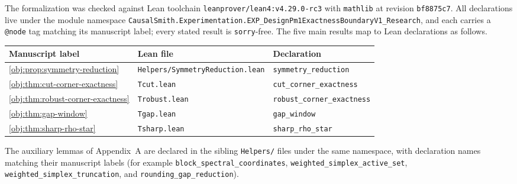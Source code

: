 The formalization was checked against Lean toolchain \texttt{leanprover/lean4:v4.29.0-rc3} with \texttt{mathlib} at revision \texttt{bf8875c7}. All declarations live under the module namespace \texttt{CausalSmith.Experimentation.EXP\_DesignPm1ExactnessBoundaryV1\_Research}, and each carries a \texttt{@node} tag matching its manuscript label; every stated result is \texttt{sorry}-free. The five main results map to Lean declarations as follows.

\begin{center}
\begin{tabular}{lll}
\textbf{Manuscript label} & \textbf{Lean file} & \textbf{Declaration} \\
\hline
\cref{obj:prop:symmetry-reduction} & \texttt{Helpers/SymmetryReduction.lean} & \texttt{symmetry\_reduction} \\
\cref{obj:thm:cut-corner-exactness} & \texttt{Tcut.lean} & \texttt{cut\_corner\_exactness} \\
\cref{obj:thm:robust-corner-exactness} & \texttt{Trobust.lean} & \texttt{robust\_corner\_exactness} \\
\cref{obj:thm:gap-window} & \texttt{Tgap.lean} & \texttt{gap\_window} \\
\cref{obj:thm:sharp-rho-star} & \texttt{Tsharp.lean} & \texttt{sharp\_rho\_star} \\
\end{tabular}
\end{center}

\noindent The auxiliary lemmas of Appendix~A are declared in the sibling \texttt{Helpers/} files under the same namespace, with declaration names matching their manuscript labels (for example \texttt{block\_spectral\_coordinates}, \texttt{weighted\_simplex\_active\_set}, \texttt{weighted\_simplex\_truncation}, and \texttt{rounding\_gap\_reduction}).

